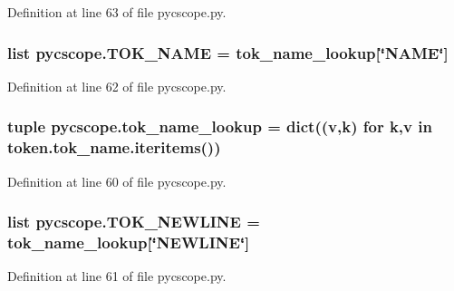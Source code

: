 Definition at line 63 of file pycscope.\-py.

\hypertarget{namespacepycscope_ac91c134ed68b7241ea365d5833d88335}{
\subsubsection[{T\-O\-K\-\_\-\-N\-A\-M\-E}]{\setlength{\rightskip}{0pt plus 5cm}list pycscope.\-T\-O\-K\-\_\-\-N\-A\-M\-E = {\bf tok\-\_\-name\-\_\-lookup}\mbox{[}\char`\"{}N\-A\-M\-E\char`\"{}\mbox{]}}}\label{namespacepycscope_ac91c134ed68b7241ea365d5833d88335}


Definition at line 62 of file pycscope.\-py.

\hypertarget{namespacepycscope_a0feaaa8934a18534689c87203668ba06}{
\subsubsection[{tok\-\_\-name\-\_\-lookup}]{\setlength{\rightskip}{0pt plus 5cm}tuple pycscope.\-tok\-\_\-name\-\_\-lookup = dict(({\bf v},k) {\bf for} k,{\bf v} in token.\-tok\-\_\-name.\-iteritems())}}\label{namespacepycscope_a0feaaa8934a18534689c87203668ba06}


Definition at line 60 of file pycscope.\-py.

\hypertarget{namespacepycscope_af38c6b38b13e012dc3ce74c8160fbfab}{
\subsubsection[{T\-O\-K\-\_\-\-N\-E\-W\-L\-I\-N\-E}]{\setlength{\rightskip}{0pt plus 5cm}list pycscope.\-T\-O\-K\-\_\-\-N\-E\-W\-L\-I\-N\-E = {\bf tok\-\_\-name\-\_\-lookup}\mbox{[}\char`\"{}N\-E\-W\-L\-I\-N\-E\char`\"{}\mbox{]}}}\label{namespacepycscope_af38c6b38b13e012dc3ce74c8160fbfab}


Definition at line 61 of file pycscope.\-py.

